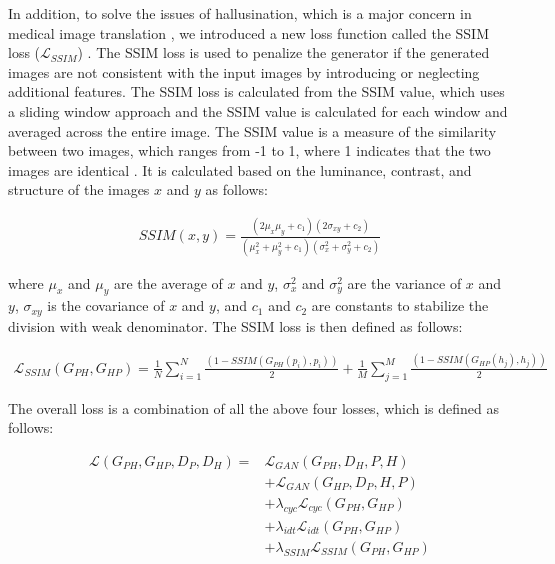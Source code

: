 \begin{refsegment}
In addition, to solve the issues of hallusination, which is a major concern in medical image translation \autocite{hallucination}, we introduced a new loss function called the SSIM loss ($\mathcal{L}_{SSIM}$) . The SSIM loss is used to penalize the generator if the generated images are not consistent with the input images by introducing or neglecting additional features. The SSIM loss is calculated from the SSIM value, which uses a sliding window approach and the SSIM value is calculated for each window and averaged across the entire image. The SSIM value is a measure of the similarity between two images, which ranges from -1 to 1, where 1 indicates that the two images are identical \autocite{ssim}. It is calculated based on the luminance, contrast, and structure of the images $x$ and $y$ as follows:

\begin{equation}
  \begin{aligned}
  SSIM(x, y) = \frac{(2\mu_{x}\mu_{y} + c_{1})(2\sigma_{xy} + c_{2})}{(\mu_{x}^{2} + \mu_{y}^{2} + c_{1})(\sigma_{x}^{2} + \sigma_{y}^{2} + c_{2})}
  \end{aligned}
\end{equation}

where $\mu_{x}$ and $\mu_{y}$ are the average of $x$ and $y$, $\sigma_{x}^{2}$ and $\sigma_{y}^{2}$ are the variance of $x$ and $y$, $\sigma_{xy}$ is the covariance of $x$ and $y$, and $c_{1}$ and $c_{2}$ are constants to stabilize the division with weak denominator. The SSIM loss is then defined as follows:

\begin{equation}
  \begin{aligned}
  \mathcal{L}_{SSIM}(G_{PH}, G_{HP}) = \frac{1}{N} \sum_{i=1}^{N} \frac{(1 - SSIM(G_{PH}(p_{i}), p_{i}))}{2} + \frac{1}{M} \sum_{j=1}^{M} \frac{(1 - SSIM(G_{HP}(h_{j}), h_{j}))}{2}
  \end{aligned}
\end{equation}

The overall loss is a combination of all the above four losses, which is defined as follows:

\begin{equation}
  \begin{aligned}
    \mathcal{L}(G_{PH}, G_{HP}, D_{P}, D_{H}) = & \mathcal{L}_{GAN}(G_{PH}, D_{H}, P, H) \\
    & + \mathcal{L}_{GAN}(G_{HP}, D_{P}, H, P) \\
    & + \lambda_{cyc}\mathcal{L}_{cyc}(G_{PH}, G_{HP}) \\
    & + \lambda_{idt}\mathcal{L}_{idt}(G_{PH}, G_{HP}) \\
    & + \lambda_{SSIM}\mathcal{L}_{SSIM}(G_{PH}, G_{HP})
  \end{aligned}
\end{equation}


\end{refsegment}
